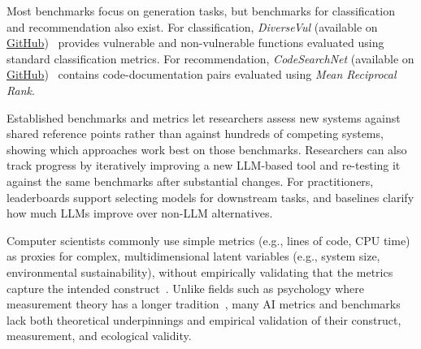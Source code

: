 Most benchmarks focus on generation tasks, but benchmarks for classification and recommendation also exist.
For classification, \emph{DiverseVul} (available on \href{https://github.com/wagner-group/diversevul}{GitHub})~\cite{DBLP:conf/raid/0001DACW23} provides vulnerable and non-vulnerable functions evaluated using standard classification metrics.
For recommendation, \emph{CodeSearchNet} (available on \href{https://github.com/github/CodeSearchNet}{GitHub})~\cite{DBLP:journals/corr/abs-1909-09436} contains code-documentation pairs evaluated using \emph{Mean Reciprocal Rank}.


Established benchmarks and metrics let researchers assess new systems against shared reference points rather than against hundreds of competing systems, showing which approaches work best on those benchmarks. Researchers can also track progress by iteratively improving a new LLM-based tool and re-testing it against the same benchmarks after substantial changes. For practitioners, leaderboards support selecting models for downstream tasks, and baselines clarify how much LLMs improve over non-LLM alternatives.


Computer scientists commonly use simple metrics (e.g., lines of code, CPU time) as proxies for complex, multidimensional latent variables (e.g., system size, environmental sustainability), without empirically validating that the metrics capture the intended construct~\cite{DBLP:conf/ease/RalphT18}. Unlike fields such as psychology where measurement theory has a longer tradition~\cite{borsboom2005measuring}, many AI metrics and benchmarks lack both theoretical underpinnings and empirical validation of their construct, measurement, and ecological validity.

